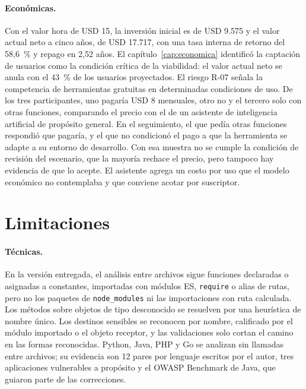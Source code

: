 \paragraph{Económicas.} Con el valor hora de USD 15, la inversión inicial
es de USD 9.575 y el valor actual neto a cinco años, de USD 17.717, con una
tasa interna de retorno del 58,6~\% y repago en 2,52 años. El
capítulo~\ref{cap:economica} identificó la
captación de usuarios como la condición crítica de la viabilidad: el valor
actual neto se anula con el 43~\% de los usuarios proyectados. El
riesgo R-07 señala la competencia de herramientas gratuitas en
determinadas condiciones de uso. De los tres participantes, uno pagaría USD 8
mensuales, otro no y el tercero solo con otras funciones, comparando el
precio con el de un asistente de inteligencia artificial de propósito
general. En el seguimiento, el que pedía otras funciones respondió que
pagaría, y el que no condicionó el pago a que la herramienta se adapte
a su entorno de desarrollo. Con esa muestra no se cumple la condición de revisión del
escenario, que la mayoría rechace el precio, pero tampoco hay evidencia
de que lo acepte. El asistente
agrega un costo por uso que el modelo económico no contemplaba y que
conviene acotar por suscriptor.

\section{Limitaciones}\label{sec:limitaciones}

\paragraph{Técnicas.} En la versión entregada, el análisis entre
archivos sigue funciones declaradas o asignadas a constantes, importadas
con módulos ES, \texttt{require} o alias de rutas, pero no los paquetes
de \texttt{node\_modules} ni las importaciones con ruta calculada. Los
métodos sobre objetos de tipo desconocido se resuelven por una heurística
de nombre único. Los destinos sensibles se reconocen por nombre,
calificado por el módulo importado o el objeto receptor, y las
validaciones solo cortan el camino en las formas reconocidas. Python,
Java, PHP y Go se analizan sin llamadas entre archivos; su evidencia son
12 pares por lenguaje escritos por el autor, tres aplicaciones
vulnerables a propósito y el OWASP Benchmark de Java, que guiaron parte
de las correcciones.

